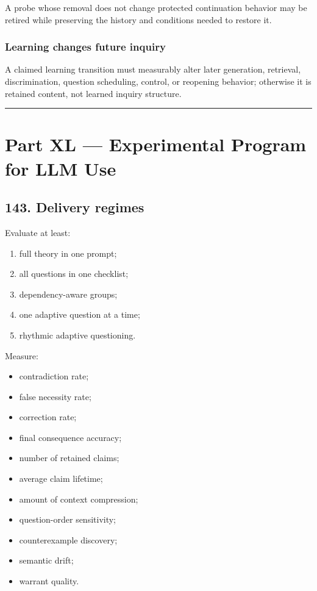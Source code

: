 \documentclass[
]{article}
\providecommand{\tightlist}{%
  \setlength{\itemsep}{0pt}\setlength{\parskip}{0pt}}
\begin{document}
A probe whose removal does not change protected continuation behavior may be
retired while preserving the history and conditions needed to restore it.

\subsubsection{Learning changes future inquiry}\label{learning-changes-future-inquiry-test}

A claimed learning transition must measurably alter later generation,
retrieval, discrimination, question scheduling, control, or reopening behavior;
otherwise it is retained content, not learned inquiry structure.

\begin{center}\rule{0.5\linewidth}{0.5pt}\end{center}

\section{Part XL --- Experimental Program for LLM
Use}\label{part-xl-experimental-program-for-llm-use}

\subsection{143. Delivery regimes}\label{delivery-regimes}

Evaluate at least:

\begin{enumerate}
\def\labelenumi{\arabic{enumi}.}
\tightlist
\item
  full theory in one prompt;
\item
  all questions in one checklist;
\item
  dependency-aware groups;
\item
  one adaptive question at a time;
\item
  rhythmic adaptive questioning.
\end{enumerate}

Measure:

\begin{itemize}
\tightlist
\item
  contradiction rate;
\item
  false necessity rate;
\item
  correction rate;
\item
  final consequence accuracy;
\item
  number of retained claims;
\item
  average claim lifetime;
\item
  amount of context compression;
\item
  question-order sensitivity;
\item
  counterexample discovery;
\item
  semantic drift;
\item
  warrant quality.
\end{itemize}
\end{document}
